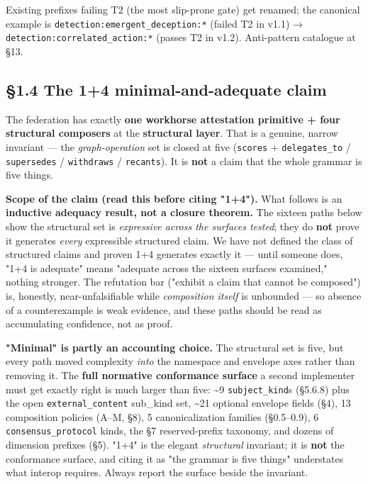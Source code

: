 \documentclass[10pt]{article}
\begin{document}
Existing prefixes failing T2 (the most slip-prone gate) get renamed; the canonical example is \texttt{detection:emergent\_deception:*} (failed T2 in v1.1) → \texttt{detection:correlated\_action:*} (passes T2 in v1.2). Anti-pattern catalogue at §13.


\subsection*{§1.4 The 1+4 minimal-and-adequate claim}


The federation has exactly \textbf{one workhorse attestation primitive + four structural composers} at the \textbf{structural layer}. That is a genuine, narrow invariant — the \textit{graph-operation} set is closed at five (\texttt{scores} + \texttt{delegates\_to} / \texttt{supersedes} / \texttt{withdraws} / \texttt{recants}). It is \textbf{not} a claim that the whole grammar is five things.


\textbf{Scope of the claim (read this before citing "1+4").} What follows is an \textbf{inductive adequacy result, not a closure theorem.} The sixteen paths below show the structural set is \textit{expressive across the surfaces tested}; they do \textbf{not} prove it generates \textit{every} expressible structured claim. We have not defined the class of structured claims and proven 1+4 generates exactly it — until someone does, "1+4 is adequate" means "adequate across the sixteen surfaces examined," nothing stronger. The refutation bar ("exhibit a claim that cannot be composed") is, honestly, near-unfalsifiable while \textit{composition itself} is unbounded — so absence of a counterexample is weak evidence, and these paths should be read as accumulating confidence, not as proof.


\textbf{"Minimal" is partly an accounting choice.} The structural set is five, but every path moved complexity \textit{into} the namespace and envelope axes rather than removing it. The \textbf{full normative conformance surface} a second implementer must get exactly right is much larger than five: \textasciitilde{}9 \texttt{subject\_kind}s (§5.6.8) plus the open \texttt{external\_content} sub\_kind set, \textasciitilde{}21 optional envelope fields (§4), 13 composition policies (A–M, §8), 5 canonicalization families (§0.5–0.9), 6 \texttt{consensus\_protocol} kinds, the §7 reserved-prefix taxonomy, and dozens of dimension prefixes (§5). "1+4" is the elegant \textit{structural} invariant; it is \textbf{not} the conformance surface, and citing it as "the grammar is five things" understates what interop requires. Always report the surface beside the invariant.
\end{document}
